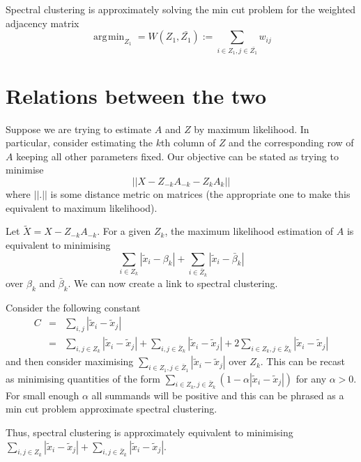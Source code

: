 \documentclass{article}
\numberwithin{equation}{section}
\numberwithin{thm}{section}
\def\IBP{Z}
\def\Weights{A}
\def\Data{X}
\DeclareMathOperator*{\argmin}{\arg\!\min}
\begin{document}
Spectral clustering is approximately solving the min cut problem for the weighted adjacency matrix \ie
\begin{equation}
\argmin_{\IBP_1} = W(\IBP_1, \bar{\IBP_1}) := \sum_{i \in \IBP_1, j \in \bar{\IBP_1}}w_{ij}
\end{equation}

\section{Relations between the two}

Suppose we are trying to estimate $\Weights$ and $\IBP$ by maximum likelihood.
In particular, consider estimating the $k$th column of $\IBP$ and the corresponding row of $\Weights$ keeping all other parameters fixed.
Our objective can be stated as trying to minimise
\begin{equation}
||\Data - \IBP_{-k}\Weights_{-k} - \IBP_{k}\Weights_{k}||
\end{equation}
where $||.||$ is some distance metric on matrices (\ie the appropriate one to make this equivalent to maximum likelihood).

Let $\tilde X = \Data - \IBP_{-k}\Weights_{-k}$.
For a given $\IBP_k$, the maximum likelihood estimation of $\Weights$ is equivalent to minimising
\begin{equation}
\sum_{i \in \IBP_k}|\tilde x_i - \beta_k| + \sum_{i \in \bar\IBP_k}|\tilde x_i - \bar\beta_k|
\end{equation}
over $\beta_k$ and $\bar\beta_k$.
We can now create a link to spectral clustering.

Consider the following constant
\begin{eqnarray}
C & = & \sum_{i,j}|\tilde x_i - \tilde x_j| \\
  & = & \sum_{i,j \in \IBP_k}|\tilde x_i - \tilde x_j| + \sum_{i,j \in \bar\IBP_k}|\tilde x_i - \tilde x_j| + 2\sum_{i \in \IBP_k, j \in \bar\IBP_k}|\tilde x_i - \tilde x_j|
\end{eqnarray}
and then consider maximising $\sum_{i \in \IBP_1, j \in \bar\IBP_1}|\tilde x_i - \tilde x_j|$ over $\IBP_k$.
This can be recast as minimising quantities of the form $\sum_{i \in \IBP_k, j \in \bar\IBP_k}(1 - \alpha|\tilde x_i - \tilde x_j|)$ for any $\alpha > 0$.
For small enough $\alpha$ all summands will be positive and this can be phrased as a min cut problem \ie approximate spectral clustering.

Thus, spectral clustering is approximately equivalent to minimising $\sum_{i,j \in \IBP_k}|\tilde x_i - \tilde x_j| + \sum_{i,j \in \bar\IBP_k}|\tilde x_i - \tilde x_j|$.
\end{document}

